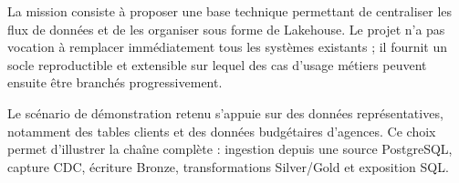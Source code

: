 La mission consiste à proposer une base technique permettant de centraliser les flux de données et de les organiser sous forme de Lakehouse. Le projet n'a pas vocation à remplacer immédiatement tous les systèmes existants ; il fournit un socle reproductible et extensible sur lequel des cas d'usage métiers peuvent ensuite être branchés progressivement.

Le scénario de démonstration retenu s'appuie sur des données représentatives, notamment des tables clients et des données budgétaires d'agences. Ce choix permet d'illustrer la chaîne complète : ingestion depuis une source PostgreSQL, capture CDC, écriture Bronze, transformations Silver/Gold et exposition SQL.
